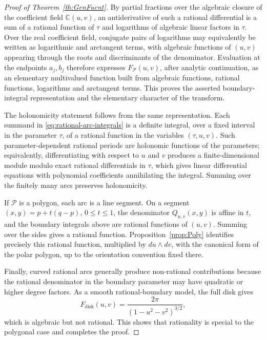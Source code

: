 \documentclass[10pt,a4paper,reqno]{amsart}
\newcommand {\bC} {\mathbb {C}}
\newcommand {\cP} {\mathcal P}
\theoremstyle{plain}
\theoremstyle{definition}
\begin{document}
\begin{proof}[Proof of Theorem~\ref{th:GenFucnt}]
By partial fractions over the algebraic closure of the coefficient field $\bC(u,v)$, an antiderivative of such a rational differential is a sum of a rational function of $\tau$ and logarithms of algebraic linear factors in $\tau$.  Over the real coefficient field, conjugate pairs of logarithms may equivalently be written as logarithmic and arctangent terms, with algebraic functions of $(u,v)$ appearing through the roots and discriminants of the denominator.  Evaluation at the endpoints $a_j,b_j$ therefore expresses $F_{\cP}(u,v)$, after analytic continuation, as an elementary multivalued function built from algebraic functions, rational functions, logarithms and arctangent terms.  This proves the asserted boundary-integral representation and the elementary character of the transform.

The holonomicity statement follows from the same representation.  Each summand in \eqref{eq:rational-arc-integrals} is a definite integral, over a fixed interval in the parameter $\tau$, of a rational function in the variables $(\tau,u,v)$.  Such parameter-dependent rational periods are holonomic functions of the parameters; equivalently, differentiating with respect to $u$ and $v$ produces a finite-dimensional module modulo exact rational differentials in $\tau$, which gives linear differential equations with polynomial coefficients annihilating the integral.  Summing over the finitely many arcs preserves holonomicity.

If $\cP$ is a polygon, each arc is a line segment.  On a segment $(x,y)=p+t(q-p)$, $0\le t\le1$, the denominator $Q_{u,v}(x,y)$ is affine in $t$, and the boundary integrals above are rational functions of $(u,v)$.  Summing over the sides gives a rational function.  Proposition~\ref{prop:Poly} identifies precisely this rational function, multiplied by $du\wedge dv$, with the canonical form of the polar polygon, up to the orientation convention fixed there.

Finally, curved rational arcs generally produce non-rational contributions because the rational denominator in the boundary parameter may have quadratic or higher degree factors.  As a smooth rational-boundary model, the full disk gives
\[
        F_{\mathrm{disk}}(u,v)=\frac{2\pi}{(1-u^2-v^2)^{3/2}},
\]
which is algebraic but not rational.  This shows that rationality is special to the polygonal case and completes the proof.
\end{proof}
\end{document}
